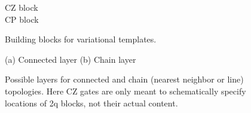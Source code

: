 \documentclass[twocolumn, amsfonts, amssymb, aps, nofootinbib]{revtex4-2}
\newcommand{\CZ}{\textsf{CZ }}
\newcommand{\CP}{\textsf{CP }}
\begin{document}
\begin{figure}
	\begin{flushleft}
		\quad 	\CZ block
		\\
		\quad \CP block
	\end{flushleft}
	\caption{Building blocks for variational templates.  }
	\label{fig blocks}
\end{figure}
\begin{figure}
	(a)	Connected layer \qquad\qquad(b) Chain layer
	\\
	\qquad\qquad
	\caption{Possible layers for connected and chain (nearest neighbor or line) topologies. Here \CZ gates are only meant to schematically specify locations of 2q blocks, not their actual content. }
	\label{fig layers}
\end{figure}
\end{document}
